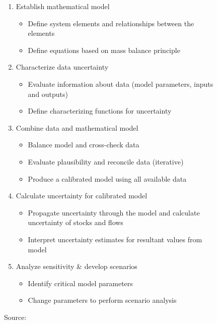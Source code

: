 \documentclass[ %
                    author={Tom Jager},
                supervisor={Dr. Daniel Schien},
                    degree={MEng},
                     title={A Bayesian Inference Engine for UMIS Structured Data},
                  subtitle={},
                      type={research},
                      year={2019} ]{dissertation}
\begin{document}
\begin{figure}[h!]
    \begin{enumerate}
        \item Establish mathematical model
        \begin{itemize}
            \item Define system elements and relationships between the elements
            \item Define equations based on mass balance principle
        \end{itemize}
        
        \item Characterize data uncertainty
        \begin{itemize}
            \item Evaluate information about data (model parameters, inputs and outputs)
            \item Define characterizing functions for uncertainty
        \end{itemize}
        
        \item Combine data and mathematical model
        \begin{itemize}
            \item Balance model and cross-check data
            \item Evaluate plausibility and reconcile data (iterative)
            \item Produce a calibrated model using all available data
        \end{itemize}
        
        \item Calculate uncertainty for calibrated model
        \begin{itemize}
            \item Propagate uncertainty through the model and calculate uncertainty of stocks and flows
            \item Interpret uncertainty estimates for resultant values from model 
        \end{itemize}
        
        \item Analyze sensitivity \& develop scenarios
        \begin{itemize}
            \item Identify critical model parameters
            \item Change parameters to perform scenario analysis
        \end{itemize}
    \end{enumerate}
    \caption{Source: \cite{laner2014systematic}}
    \label{fig:incorp uncertainty procedure}
\end{figure}
\end{document}
